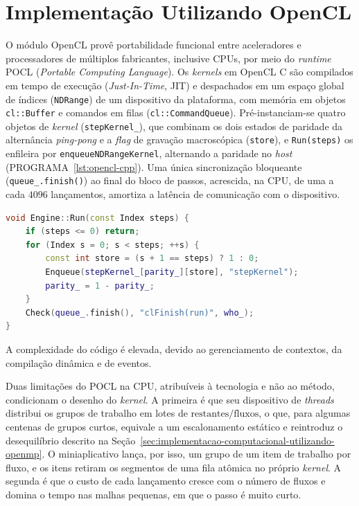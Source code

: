 
\section{Implementação Utilizando OpenCL}\label{sec:implementacao-computacional-utilizando-opencl}

O módulo OpenCL provê portabilidade funcional entre aceleradores e processadores de múltiplos fabricantes, inclusive CPUs, por meio do \textit{runtime} POCL (\textit{Portable Computing Language}). %
Os \textit{kernels} em OpenCL C são compilados em tempo de execução (\textit{Just-In-Time}, JIT) e despachados em um espaço global de índices (\texttt{NDRange}) de um dispositivo da plataforma, com memória em objetos \texttt{cl::Buffer} e comandos em filas (\texttt{cl::CommandQueue}).
Pré-instanciam-se quatro objetos de \textit{kernel} (\texttt{step\allowbreak Kernel\_\allowbreak[parity]\allowbreak[store]}), que combinam os dois estados de paridade da alternância \textit{ping-pong} e a \textit{flag} de gravação macroscópica (\texttt{store}), e \texttt{Run(steps)} os enfileira por \texttt{enqueue\allowbreak ND\allowbreak Range\allowbreak Kernel}, alternando a paridade no \textit{host} (PROGRAMA~\ref{lst:opencl-cpp}).
Uma única sincronização bloqueante (\texttt{queue\_.finish()}) ao final do bloco de passos, acrescida, na CPU, de uma a cada $4096$ lançamentos, amortiza a latência de comunicação com o dispositivo.

\noindent\begin{minipage}{\linewidth}
\begin{lstlisting}[language=C++, caption={Enfileiramento assíncrono dos passos fundidos com alternância de paridade no OpenCL.}, label={lst:opencl-cpp}]
void Engine::Run(const Index steps) {
    if (steps <= 0) return;
    for (Index s = 0; s < steps; ++s) {
        const int store = (s + 1 == steps) ? 1 : 0;
        Enqueue(stepKernel_[parity_][store], "stepKernel");
        parity_ = 1 - parity_;
    }
    Check(queue_.finish(), "clFinish(run)", who_);
}
\end{lstlisting}
\end{minipage}

A complexidade do código é elevada, devido ao gerenciamento de contextos, da compilação dinâmica e de eventos.

Duas limitações do POCL na CPU, atribuíveis à tecnologia e não ao método, condicionam o desenho do \textit{kernel}.
A primeira é que seu dispositivo de \textit{threads} distribui os grupos de trabalho em lotes de $\mathrm{restantes}/\mathrm{fluxos}$, o que, para algumas centenas de grupos curtos, equivale a um escalonamento estático e reintroduz o desequilíbrio descrito na Seção~\ref{sec:implementacao-computacional-utilizando-openmp}.
O miniaplicativo lança, por isso, um grupo de um item de trabalho por fluxo, e os itens retiram os segmentos de uma fila atômica no próprio \textit{kernel}.
A segunda é que o custo de cada lançamento cresce com o número de fluxos e domina o tempo nas malhas pequenas, em que o passo é muito curto.

